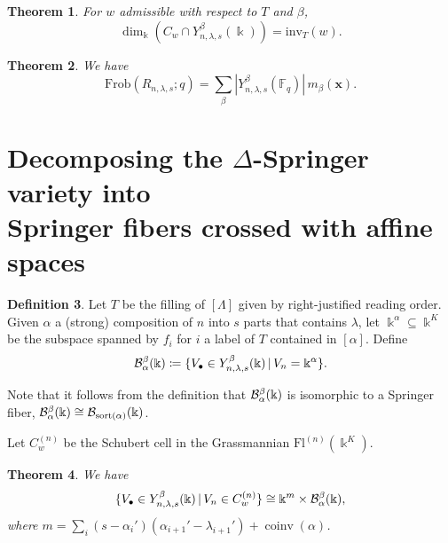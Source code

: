 \documentclass[11pt]{amsart}
\newtheorem{theorem}{Theorem}[section] %
\theoremstyle{definition}
\newtheorem{definition}[theorem]{Definition}
\newcommand{\st}{\,|\,}
\newcommand{\Fl}{\mathrm{Fl}}
\newcommand{\Frob}{\mathrm{Frob}}
\newcommand{\la}{\lambda}
\newcommand{\sort}{\mathrm{sort}}
\newcommand{\inv}{\mathrm{inv}}
\newcommand{\bx}{\mathbf{x}}
\newcommand{\Fq}{\mathbb{F}_q}
\newcommand{\bk}{\Bbbk}
\DeclareMathOperator{\coinv}{coinv}
\begin{document}
\begin{theorem}
For $w$ admissible with respect to $T$ and $\beta$, 
\[
\dim_\bk(C_w\cap Y_{n,\la,s}^\beta(\bk)) = \inv_T(w).
\]
\end{theorem}

\begin{theorem}
We have
\[\Frob(R_{n,\la,s};q) = \sum_{\beta}|Y_{n,\la,s}^\beta(\Fq)|\, m_\beta(\bx).\]
\end{theorem}

\section{Decomposing the $\Delta$-Springer variety into \\Springer fibers crossed with affine spaces}

\begin{definition}
Let $T$ be the filling of $[\Lambda]$ given by right-justified reading order. Given $\alpha$ a (strong) composition of $n$ into $s$ parts that contains $\la$, let $\bk^\alpha\subseteq \bk^K$ be the subspace spanned by $f_{i}$ for $i$ a label of $T$ contained in $[\alpha]$. Define
\begin{align*}
    \cB^\beta_\alpha(\bk) \coloneqq \{V_\bullet \in Y_{n,\la,s}^\beta(\bk) \st V_n = \bk^\alpha\}.
\end{align*}
\end{definition}
Note that it follows from the definition that $\cB_\alpha^\beta(\bk)$ is isomorphic to a Springer fiber, $\cB_\alpha^\beta(\bk)\cong \cB_{\sort(\alpha)}(\bk)$.

Let $C_w^{(n)}$ be the Schubert cell in the Grassmannian $\Fl^{(n)}(\bk^K)$.

\begin{theorem}
We have
\[
\{V_\bullet\in Y_{n,\la,s}^\beta(\bk)\st V_n\in C_w^{(n)}\}\cong \bk^m\times \cB_\alpha^{\beta}(\bk),
\]
where $m = \sum_i(s-\alpha_i')(\alpha_{i+1}'-\la_{i+1}') + \coinv(\alpha)$.
\end{theorem}
\end{document}
